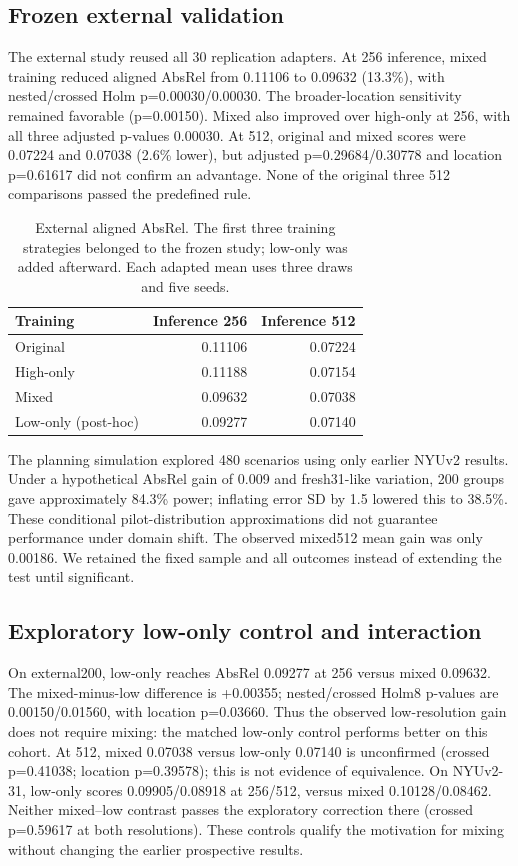 \subsection{Frozen external validation}
The external study reused all 30 replication adapters. At 256 inference, mixed training reduced aligned AbsRel from 0.11106 to 0.09632 (13.3\%), with nested/crossed Holm p=0.00030/0.00030. The broader-location sensitivity remained favorable (p=0.00150). Mixed also improved over high-only at 256, with all three adjusted p-values 0.00030. At 512, original and mixed scores were 0.07224 and 0.07038 (2.6\% lower), but adjusted p=0.29684/0.30778 and location p=0.61617 did not confirm an advantage. None of the original three 512 comparisons passed the predefined rule.

\begin{table}[t]
\centering\small
\caption{External aligned AbsRel. The first three training strategies belonged to the frozen study; low-only was added afterward. Each adapted mean uses three draws and five seeds.}
\label{tab:external}
\begin{tabular}{lrr}\toprule
Training & Inference 256 & Inference 512\\\midrule
Original & 0.11106 & 0.07224\\
High-only & 0.11188 & 0.07154\\
Mixed & 0.09632 & 0.07038\\
Low-only (post-hoc) & 0.09277 & 0.07140\\\bottomrule
\end{tabular}
\end{table}

The planning simulation explored 480 scenarios using only earlier NYUv2 results. Under a hypothetical AbsRel gain of 0.009 and fresh31-like variation, 200 groups gave approximately 84.3\% power; inflating error SD by 1.5 lowered this to 38.5\%. These conditional pilot-distribution approximations did not guarantee performance under domain shift. The observed mixed512 mean gain was only 0.00186. We retained the fixed sample and all outcomes instead of extending the test until significant.

\subsection{Exploratory low-only control and interaction}
On external200, low-only reaches AbsRel 0.09277 at 256 versus mixed 0.09632. The mixed-minus-low difference is +0.00355; nested/crossed Holm8 p-values are 0.00150/0.01560, with location p=0.03660. Thus the observed low-resolution gain does not require mixing: the matched low-only control performs better on this cohort. At 512, mixed 0.07038 versus low-only 0.07140 is unconfirmed (crossed p=0.41038; location p=0.39578); this is not evidence of equivalence. On NYUv2-31, low-only scores 0.09905/0.08918 at 256/512, versus mixed 0.10128/0.08462. Neither mixed--low contrast passes the exploratory correction there (crossed p=0.59617 at both resolutions). These controls qualify the motivation for mixing without changing the earlier prospective results.

